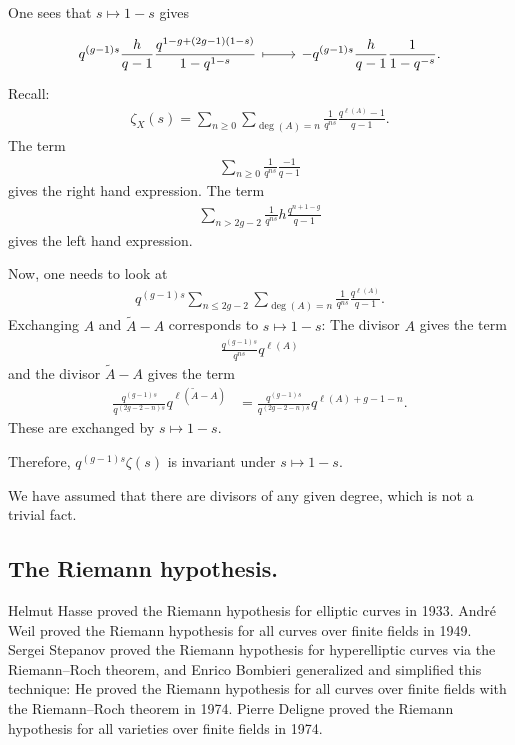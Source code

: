 \documentclass [11 pt, oneside] {article}
\begin{document}
One sees that $s\longmapsto 1-s$ gives
\[
\begin{tikzcd}
	\displaystyle q^{(g-1) s}\frac{h}{q-1}\frac{q^{1-g+(2g-1) (1-s)}}{1-q^{1-s}}\ar[r,mapsto]&\displaystyle -q^{(g-1) s}\frac{h}{q-1} \frac{1}{1-q^{-s}}.
\end{tikzcd}
\]
Recall:
\begin{align*}
	\zeta_{X}(s) =  \sum_{n\ge 0}^{} \sum_{\deg(A) =n}^{} \frac{1}{q^{ns}}\frac{q^{\ell(A)}-1}{q-1}.
\end{align*}
The term
\begin{align*}
	\sum_{n\ge 0}^{} \frac{1}{q^{ns}}\frac{-1}{q-1}
\end{align*}
gives the right hand expression.
The term
\begin{align*}
	\sum_{n>2g-2}^{} \frac{1}{q^{ns}}h\frac{q^{n+1-g}}{q-1}
\end{align*}
gives the left hand expression. 

Now, one needs to look at
\begin{align*}
	q^{(g-1) s}\sum_{n\le 2g-2}^{} \sum_{\deg(A)=n}^{} \frac{1}{q^{ns}} \frac{q^{\ell(A)}}{q-1}.
\end{align*}
Exchanging $A$ and $\tilde A-A$ corresponds to $s\longmapsto 1-s$: The divisor $A$ gives the term
\begin{align*}
	\frac{q^{(g-1) s}}{q^{ns}} q^{\ell(A)} 
\end{align*}
and the divisor $\tilde A-A$ gives the term
\begin{align*}
	\frac{q^{(g-1) s}}{q^{(2g-2-n) s}}q^{\ell(\tilde A-A)} &=  \frac{q^{(g-1) s}}{q^{(2g-2-n) s}}q^{\ell(A) +g-1-n}.
\end{align*}
These are exchanged by $s\longmapsto 1-s$.

Therefore, $q^{(g-1) s}\zeta(s)$ is invariant under $s\longmapsto 1-s$.

\begin{remark}
	We have assumed that there are divisors of any given degree, which is not a trivial fact.
\end{remark}

\subsection{The Riemann hypothesis.}
Helmut Hasse proved the Riemann hypothesis for elliptic curves in 1933. 
Andr\'e Weil proved the Riemann hypothesis for all curves over finite fields in 1949. 
Sergei Stepanov proved the Riemann hypothesis for hyperelliptic curves via the Riemann--Roch theorem, and Enrico Bombieri generalized and simplified this technique: He proved the Riemann hypothesis for all curves over finite fields with the Riemann--Roch theorem in 1974.
Pierre Deligne proved the Riemann hypothesis for all varieties over finite fields in 1974.
\end{document}

